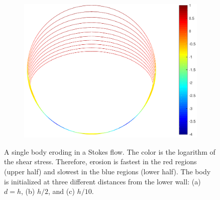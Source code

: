\documentclass[preprint,10pt]{elsarticle}
\begin{document}
\begin{figure}[htbp]
\begin{center}
\begin{subfigure}[b]{0.3\textwidth}
\caption{}
\end{subfigure}
\begin{subfigure}[b]{0.38\textwidth}
\includegraphics[width =\textwidth]{./figs/1b_0d4r0d1h_shear}
\caption{}
\end{subfigure}
\caption{\label{fig:NearWall} A single body eroding in a Stokes flow.
The color is the logarithm of the shear stress. Therefore, erosion is
fastest in the red regions (upper half) and slowest in the blue regions
(lower half).  The body is initialized at three different distances from
the lower wall: (a) $d=h$, (b) $h/2$, and (c) $h/10$.}
\end{center}
\end{figure}
\end{document}
